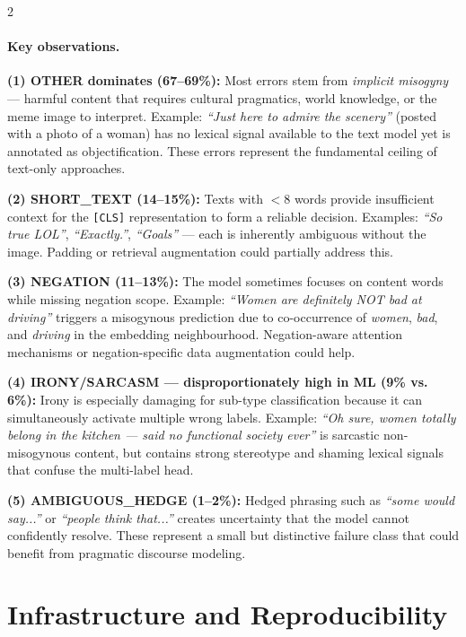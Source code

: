 \documentclass[11pt]{article}
\begin{document}
\begin{multicols}{2}
\paragraph{Key observations.}
\textbf{(1) OTHER dominates (67–69\%):} Most errors stem from \textit{implicit misogyny} — harmful content that requires cultural pragmatics, world knowledge, or the meme image to interpret. Example: \textit{``Just here to admire the scenery''} (posted with a photo of a woman) has no lexical signal available to the text model yet is annotated as objectification. These errors represent the fundamental ceiling of text-only approaches.

\textbf{(2) SHORT\_TEXT (14–15\%):} Texts with $<$8 words provide insufficient context for the \texttt{[CLS]} representation to form a reliable decision. Examples: \textit{``So true LOL''}, \textit{``Exactly.''}, \textit{``Goals''} — each is inherently ambiguous without the image. Padding or retrieval augmentation could partially address this.

\textbf{(3) NEGATION (11–13\%):} The model sometimes focuses on content words while missing negation scope. Example: \textit{``Women are definitely NOT bad at driving''} triggers a misogynous prediction due to co-occurrence of \textit{women}, \textit{bad}, and \textit{driving} in the embedding neighbourhood. Negation-aware attention mechanisms or negation-specific data augmentation could help.

\textbf{(4) IRONY/SARCASM — disproportionately high in ML (9\% vs. 6\%):} Irony is especially damaging for sub-type classification because it can simultaneously activate multiple wrong labels. Example: \textit{``Oh sure, women totally belong in the kitchen — said no functional society ever''} is sarcastic non-misogynous content, but contains strong stereotype and shaming lexical signals that confuse the multi-label head.

\textbf{(5) AMBIGUOUS\_HEDGE (1–2\%):} Hedged phrasing such as \textit{``some would say...''} or \textit{``people think that...''} creates uncertainty that the model cannot confidently resolve. These represent a small but distinctive failure class that could benefit from pragmatic discourse modeling.

\section{Infrastructure and Reproducibility}


\end{multicols}
\end{document}
